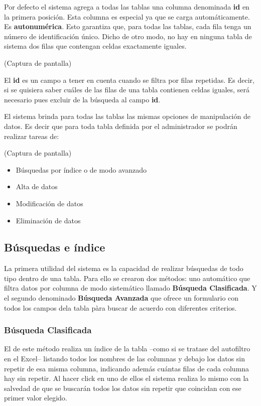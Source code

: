 \documentclass[a4paper,10pt]{article}
\begin{document}
Por defecto el sistema agrega a todas las tablas una columna denominada \textbf{id} en la primera posición. Esta columna es especial ya que se carga automáticamente. Es \textbf{autonumérica}. Esto garantiza que, para todas las tablas, cada fila tenga un número de identificación único. Dicho de otro modo, no hay en ninguna tabla de sistema dos filas que contengan celdas exactamente iguales.

(Captura de pantalla)

El \textbf{id} es un campo a tener en cuenta cuando se filtra por filas repetidas. Es decir, si se quisiera saber cuáles de las filas de una tabla contienen celdas iguales, será necesario pues excluir de la búsqueda al campo \textbf{id}.

El sistema brinda para todas las tablas las mismas opciones de manipulación de datos. Es decir que para toda tabla definida por el administrador se podrán realizar tareas de:

(Captura de pantalla)

\begin{itemize}
 \item Búsquedas por índice o de modo avanzado
 \item Alta de datos
 \item Modificación de datos 
 \item Eliminación de datos
\end{itemize}

\subsection{Búsquedas e índice}

La primera utilidad del sistema es la capacidad de realizar búsquedas de todo tipo dentro de una tabla. 
Para ello se crearon dos métodos: uno automático que filtra datos por columna de modo sistemático llamado \textbf{Búsqueda Clasificada}. Y el segundo denominado \textbf{Búsqueda Avanzada} que ofrece un formulario con todos los campos dela tabla pàra buscar de acuerdo con diferentes criterios.

\subsubsection{Búsqueda Clasificada}

El de este método realiza un índice de la tabla --como si se tratase del autofiltro en el Excel-- listando todos los nombres de las columnas y debajo los datos sin repetir de esa misma columna, indicando además cuántas filas de cada columna hay sin repetir. Al hacer click en uno de ellos el sistema realiza lo mismo con la salvedad de que se buscarán todos los datos sin repetir que coincidan con ese primer valor elegido.
\end{document}
